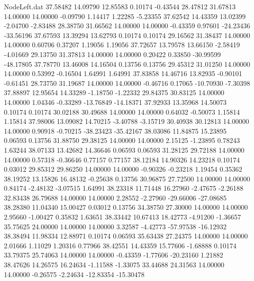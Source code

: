 \begin{filecontents}{NodeLeft.dat}
  37.58482   14.09790   12.85583     0.10174   -0.43544   28.47812   31.67813   14.00000   14.00000   -0.09790    1.14417    1.22285   -5.23355
  37.62542   14.43359   13.02399    -2.04700   -2.83488   28.38750   31.66562   14.00000   14.00000   -0.43359    0.97601  -24.23436  -33.56196
  37.67593   13.39294   13.62793     0.10174    0.10174   29.16562   31.38437   14.00000   14.00000    0.60706    0.37207    1.19056    1.19056
  37.72657   13.79578   13.66150    -2.58419   -4.01669   29.13750   31.37813   14.00000   14.00000    0.20422    0.33850  -30.99599  -48.17805
  37.78770   13.46008   14.16504     0.13756    0.13756   29.45312   31.01250   14.00000   14.00000    0.53992   -0.16504    1.64991    1.64991
  37.83858   14.46716   13.82935    -0.90101   -0.61451   28.73750   31.19687   14.00000   14.00000   -0.46716    0.17065  -10.70930   -7.30398
  37.88897   12.95654   14.33289    -1.18750   -1.22332   29.84375   30.83125   14.00000   14.00000    1.04346   -0.33289  -13.76849  -14.18371
  37.92933   13.35968   14.50073     0.10174    0.10174   30.02188   30.49688   14.00000   14.00000    0.64032   -0.50073    1.15814    1.15814
  37.98006   13.09082   14.70215    -3.40788   -3.15719   30.40938   30.12813   14.00000   14.00000    0.90918   -0.70215  -38.23423  -35.42167
  38.03086   11.84875   15.23895     0.06593    0.13756   31.88750   29.38125   14.00000   14.00000    2.15125   -1.23895    0.78243    1.63244
  38.07133   13.42682   14.36646     0.06593    0.06593   31.28125   29.72188   14.00000   14.00000    0.57318   -0.36646    0.77157    0.77157
  38.12184   14.90326   14.23218     0.10174    0.03012   29.85312   29.86250   14.00000   14.00000   -0.90326   -0.23218    1.19454    0.35362
  38.19252   13.15826   16.48132    -0.25638    0.13756   30.96875   27.72500   14.00000   14.00000    0.84174   -2.48132   -3.07515    1.64991
  38.23318   11.71448   16.27960    -2.47675   -2.26188   32.83438   26.79688   14.00000   14.00000    2.28552   -2.27960  -29.66006  -27.08685
  38.28380   11.04340   15.00427     0.03012    0.13756   34.38750   27.30000   14.00000   14.00000    2.95660   -1.00427    0.35832    1.63651
  38.33442   10.67413   18.42773    -4.91200   -1.36657   35.75625   24.00000   14.00000   14.00000    3.32587   -4.42773  -57.97538  -16.12932
  38.38494   11.98334   12.88971     0.10174    0.06593   35.63438   27.24375   14.00000   14.00000    2.01666    1.11029    1.20316    0.77966
  38.42551   14.43359   15.77606    -1.68888    0.10174   33.79375   25.74063   14.00000   14.00000   -0.43359   -1.77606  -20.23160    1.21882
  38.47626   14.26575   16.24634    -1.11588   -1.33075   33.44688   24.31563   14.00000   14.00000   -0.26575   -2.24634  -12.83354  -15.30478

\end{filecontents}
